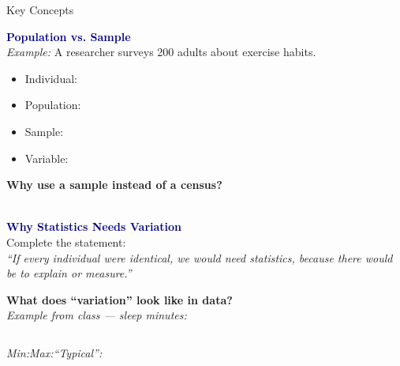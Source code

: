 \documentclass[10pt]{article}
\begin{document}
\begin{notesbox}{Key Concepts}
\small
\begin{multicols}{2}

\textbf{\textcolor{navy}{Population vs. Sample}}\\
\textit{Example:} A researcher surveys 200 adults about exercise habits.
\begin{itemize}[itemsep=2pt]
  \item Individual: \blank{3.5cm}
  \item Population: \blank{3.5cm}
  \item Sample: \blank{3.5cm}
  \item Variable: \blank{3.5cm}
\end{itemize}

\vspace{4pt}
\textbf{Why use a sample instead of a census?}\\
\writeline\\[1pt]\writeline

\columnbreak

\textbf{\textcolor{navy}{Why Statistics Needs Variation}}\\[3pt]
Complete the statement:\\[4pt]
\textit{``If every individual were identical, we would \blank{2cm}
need statistics, because there would be \blank{2cm}
\blank{2cm} to explain or measure.''}

\vspace{6pt}
\textbf{What does ``variation'' look like in data?}\\
\textit{Example from class — sleep minutes:}\\[4pt]
\begin{center}
\begin{tabular}{|c|c|c|c|c|}
\hline
\rule{0pt}{10pt} & & & & \\
\hline
\end{tabular}
\end{center}
\vspace{2pt}
\textit{Min:\;\blank{1cm}\quad Max:\;\blank{1cm}\quad ``Typical'':\;\blank{1.5cm}}

\end{multicols}
\end{notesbox}

\vspace{0.1in}
\end{document}
